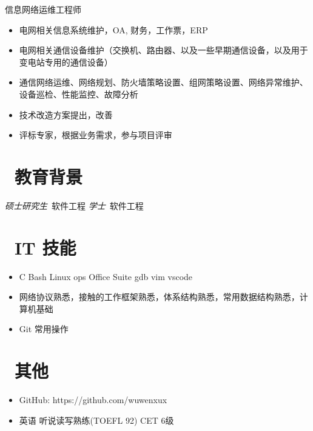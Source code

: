 \documentclass{resume}
\begin{document}
\begin{onehalfspacing}
信息网络运维工程师
\begin{itemize}
  \item 电网相关信息系统维护，OA, 财务，工作票，ERP
  \item 电网相关通信设备维护（交换机、路由器、以及一些早期通信设备，以及用于变电站专用的通信设备）
  \item 通信网络运维、网络规划、防火墙策略设置、组网策略设置、网络异常维护、设备巡检、性能监控、故障分析
  \item 技术改造方案提出，改善
  \item 评标专家，根据业务需求，参与项目评审
\end{itemize}
\end{onehalfspacing}

\section{\faGraduationCap\  教育背景}
\textit{硕士研究生}\ 软件工程
\textit{学士}\ 软件工程

\section{\faCogs\ IT 技能}
\begin{itemize}[parsep=0.5ex]
  \item C Bash Linux ops Office Suite gdb vim vscode
  \item 网络协议熟悉，接触的工作框架熟悉，体系结构熟悉，常用数据结构熟悉，计算机基础
  \item Git 常用操作 
\end{itemize}

\section{\faInfo\ 其他}
\begin{itemize}[parsep=0.5ex]
  \item GitHub: https://github.com/wuwenxux
  \item 英语  听说读写熟练(TOEFL 92) CET 6级
\end{itemize}

%
%
\end{document}
